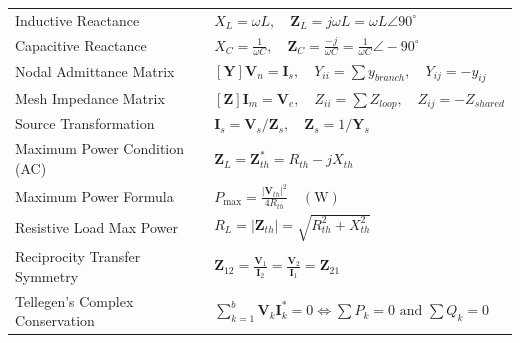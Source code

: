 \documentclass[12pt,a4paper]{article}
\renewcommand{\arraystretch}{1.45}
\begin{document}
\begin{tcolorbox}[formulabox, title={\textbf{Key Formulas and Network Relations at a Glance}}]
\renewcommand{\arraystretch}{1.35}
\begin{tabularx}{\linewidth}{B{5.0cm} X}
Inductive Reactance & $X_L = \omega L, \quad \mathbf{Z}_L = j\omega L = \omega L \angle 90^\circ$ \\[4pt]
Capacitive Reactance & $X_C = \frac{1}{\omega C}, \quad \mathbf{Z}_C = \frac{-j}{\omega C} = \frac{1}{\omega C} \angle -90^\circ$ \\[4pt]
Nodal Admittance Matrix & $[\mathbf{Y}]\mathbf{V}_n = \mathbf{I}_s, \quad Y_{ii} = \sum y_{branch}, \quad Y_{ij} = -y_{ij}$ \\[4pt]
Mesh Impedance Matrix & $[\mathbf{Z}]\mathbf{I}_m = \mathbf{V}_e, \quad Z_{ii} = \sum Z_{loop}, \quad Z_{ij} = -Z_{shared}$ \\[4pt]
Source Transformation & $\mathbf{I}_s = \mathbf{V}_s / \mathbf{Z}_s, \quad \mathbf{Z}_s = 1 / \mathbf{Y}_s$ \\[4pt]
Maximum Power Condition (AC) & $\mathbf{Z}_L = \mathbf{Z}_{th}^* = R_{th} - jX_{th}$ \\[4pt]
Maximum Power Formula & $P_{\max} = \frac{|\mathbf{V}_{th}|^2}{4 R_{th}} \quad (\text{W})$ \\[4pt]
Resistive Load Max Power & $R_L = |\mathbf{Z}_{th}| = \sqrt{R_{th}^2 + X_{th}^2}$ \\[4pt]
Reciprocity Transfer Symmetry & $\mathbf{Z}_{12} = \frac{\mathbf{V}_1}{\mathbf{I}_2} = \frac{\mathbf{V}_2}{\mathbf{I}_1} = \mathbf{Z}_{21}$ \\[4pt]
Tellegen's Complex Conservation & $\sum_{k=1}^b \mathbf{V}_k \mathbf{I}_k^* = 0 \iff \sum P_k = 0 \text{ and } \sum Q_k = 0$ \\[4pt]
\end{tabularx}
\end{tcolorbox}
\end{document}
